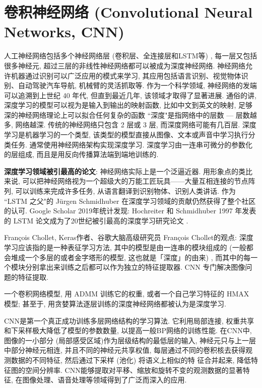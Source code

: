 \section{卷积神经网络 (Convolutional Neural Networks, CNN)}
人工神经网络包括多个神经网络层 (卷积层、全连接层和LSTM等) , 每一层又包括很多神经元, 超过三层的非线性神经网络都可以被成为深度神经网络.
神经网络允许机器通过识别可以广泛应用的模式来学习, 其应用包括语言识别、视觉物体识别、自动驾驶汽车导航, 机械臂的灵活抓取等.
作为一个科学领域, 神经网络的发端可以追溯到上世纪 40 年代, 但直到最近几年, 该领域才取得了显著进展.
通俗的讲, 深度学习的模型可以视为是输入到输出的映射函数, 比如中文到英文的映射, 足够深的神经网络理论上可以拟合任何复杂的函数
 ``深度"是指网络中的层数 — 层数越多, 网络越深. 传统的神经网络只包含 2 层或 3 层, 而深度网络可能有几百层.
深度学习是机器学习的一个类型, 该类型的模型直接从图像、文本或声音中学习执行分类任务. 通常使用神经网络架构实现深度学习.
深度学习由一连串可微分的参数化的层组成, 而且是用反向传播算法端到端地训练的.
\begin{remark}
\textbf{深度学习领域被引最高的论文}:
神经网络实际上是一个泛逼近器. 用形象点的类比来说, 可以把神经网络视为一个超级大的万能工匠玩具——大量互相连接的节点阵列, 可以训练来完成许多任务, 从语言翻译到识别物体、识别人类讲话.
作为 ``LSTM 之父"的 Jürgen Schmidhuber 在深度学习领域的贡献仍然获得了整个社区的认可.
Google Scholar 2019年统计发现: Hochreiter 和 Schmidhuber 1997 年发表的 LSTM 论文成为了20世纪被引最高的深度学习研究论文 \cite{HochreiterNC1997}.
\end{remark}

François Chollet, Keras作者、谷歌大脑高级研究员 François Chollet的观点: 深度学习应该指的是一种表征学习方法, 其中的模型是由一连串的模块组成的 (一般都会堆成一个多层的或者金字塔形的模型, 这也就是「深度」的由来) , 而其中的每一个模块分别拿出来训练之后都可以作为独立的特征提取器. CNN 专门解决图像问题的特征提取.
\begin{remark}
    一个卷积网络模型, 用 ADMM 训练它的权重, 或者一个自己学习特征的 HMAX 模型; 甚至于, 用贪婪算法逐层训练的深度神经网络都被认为是深度学习.
\end{remark}

CNN是第一个真正成功训练多层网络结构的学习算法. 它利用局部连接, 权重共享和下采样极大降低了模型的参数数量, 以提高一般BP网络的训练性能.
在CNN中, 图像的一小部分 (局部感受区域)作为层级结构的最低层的输入, 神经元只与上一层中部分神经元相连, 并且不同的神经元共享权值, 每层通过不同的卷积核去获得观测数据的不同特征, 然后通过下采样 (池化) 将语义上相似的特
征合并起来, 降低特征图的空间分辨率.
CNN能够提取对平移、缩放和旋转不变的观测数据的显著特征, 在图像处理、语音处理等领域得到了广泛而深入的应用.
